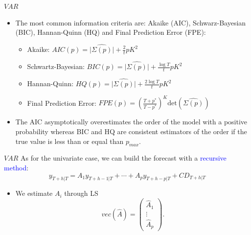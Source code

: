 \documentclass{beamer}
\newcommand{\?}{?`}
\begin{document}
\begin{frame}{$VAR$}
  \begin{itemize}
  \item The most common information criteria are: Akaike (AIC), Schwarz-Bayesian (BIC), Hannan-Quinn (HQ) and Final Prediction Error (FPE):
    \begin{itemize}
    \item Akaike: $AIC(p)=\vert \hat{\Sigma(p)} \vert +
      \frac{2}{t}pK^2$
    \item Schwartz-Bayesian: $BIC(p)=\vert \hat{\Sigma(p)} \vert +
      \frac{\log T}{t}pK^2$
    \item Hannan-Quinn: $HQ(p)=\vert \hat{\Sigma(p)} \vert +
      \frac{2\log T}{t}pK^2$
    \item Final Prediction Error:
      $FPE(p)=\left(\frac{T+p^{*}}{T-p^{*}}\right)^K
      \text{det}(\hat{\Sigma(p)})$
    \end{itemize}
  \item The AIC asymptotically overestimates the order of the model with a positive
  probability whereas BIC and HQ are consistent estimators of the order if the true value is less than or equal than $p_{max}$.
  \end{itemize}
\end{frame}

\begin{frame}{$VAR$}
  As for the univariate case, we can build the forecast with a \textcolor{blue}{recursive method}:
    \begin{displaymath}
    y_{T+h|T}=A_1y_{T+h-1|T} + \cdots + A_py_{T+h-p|T} + CD_{T+h|T}
  \end{displaymath}
  \begin{itemize}
  \item We estimate $A_i$ through LS
    \begin{displaymath}
        vec(\hat{A})=\left(
        \begin{array}{c}
          \hat{A}_1 \\
          \vdots \\
          \hat{A}_p
        \end{array}
        \right).
    \end{displaymath}
  \end{itemize}
\end{frame}
\end{document}
